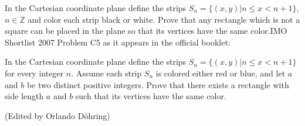 In the Cartesian coordinate plane define the strips $ S_n = \{(x,y)|n\le x < n + 1\}$,  $ n\in\mathbb{Z}$ and color each strip black or white. Prove that any rectangle which is not a square can be placed in the plane so that its vertices have the same color.IMO Shortlist 2007 Problem C5 as it appears in the official booklet:

In the Cartesian coordinate plane define the strips $ S_n = \{(x,y)|n\le x < n + 1\}$ for every integer $ n.$ Assume each strip $ S_n$ is colored either red or blue, and let $ a$ and $ b$ be two distinct positive integers. Prove that there exists a rectangle with side length $ a$ and $ b$ such that its vertices have the same color.

(Edited by Orlando Döhring)